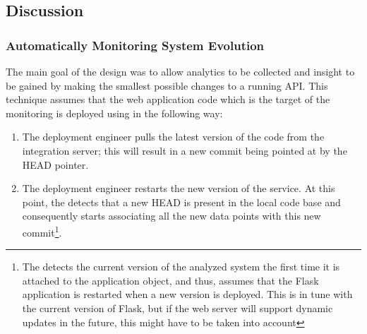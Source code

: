 \documentclass{sig-alternate-05-2015}
\begin{document}

\subsection{Discussion}


  \subsubsection{Automatically Monitoring System Evolution}

  The main goal of the \tool design was to allow analytics to be collected and insight to be gained by making the smallest possible changes to a running API. %
%
  This technique assumes that the web application code which is the target of the monitoring is deployed using \git in the following way: 

  \begin{enumerate}
    \item The deployment engineer pulls the latest version of the code from the integration server; this will result in a new commit being pointed at by the HEAD pointer. %
    \item The deployment engineer restarts the new version of the service. At this point, the \tool detects that a new HEAD is present in the local code base and consequently starts associating all the new data points with this new commit\footnote{The \tool detects the current version of the analyzed system the first time it is attached to the application object, and thus, assumes that the Flask application is restarted when a new version is deployed. This is in tune with the current version of Flask, but if the web server will support dynamic updates in the future, this might have to be taken into account}.
  \end{enumerate}
\end{document}
